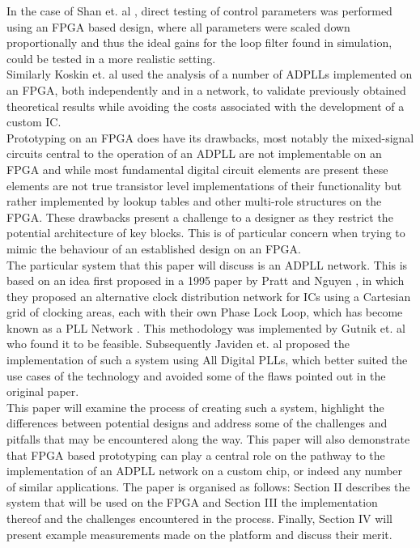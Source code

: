 \documentclass[conference]{IEEEtran}
\begin{document}
{In the case of Shan et. al \cite{shan2014phd}, direct testing of control parameters was performed using an FPGA based design, where all parameters were scaled down proportionally and thus the ideal gains for the loop filter found in simulation, could be tested in a more realistic setting.\\
Similarly Koskin et. al \cite{theboys2019} used the analysis of a number of ADPLLs implemented on an FPGA, both independently and in a network, to validate previously obtained theoretical results while avoiding the costs associated with the development of a custom IC.\\
Prototyping on an FPGA does have its drawbacks, most notably the mixed-signal circuits central to the operation of an ADPLL are not implementable on an FPGA and while most fundamental digital circuit elements are present these elements are not true transistor level implementations of their functionality but rather implemented by lookup tables and other multi-role structures on the FPGA. These drawbacks present a challenge to a designer as they restrict the potential architecture of key blocks. This is of particular concern when trying to mimic the behaviour of an established design on an FPGA.\\
The particular system that this paper will discuss is an ADPLL network. This is based on an idea first proposed in a 1995 paper by Pratt and Nguyen \cite{pratt1995distributed}, in which they proposed an alternative clock distribution network for ICs using a Cartesian grid of clocking areas, each with their own Phase Lock Loop, which has become known as a PLL Network . This methodology was implemented by Gutnik et. al \cite{gutnik2000active} who found it to be feasible. Subsequently Javiden et. al
\cite{javidan2011all} proposed the implementation of such a system using All Digital PLLs, which better suited the use cases of the technology and avoided some of the flaws pointed out in the original paper.\\
This paper will examine the process of creating such a system, highlight the differences between potential designs and address some of the challenges and pitfalls that may be encountered along the way. This paper will also demonstrate that FPGA based prototyping can play a central role on the pathway to the implementation of an ADPLL network on a custom chip, or indeed any number of similar applications. The paper is organised as follows: Section II describes the system that will be used on the FPGA and Section III the implementation thereof and the challenges encountered in the process. Finally, Section IV will present example measurements made on the platform and discuss their merit.

}
\end{document}
